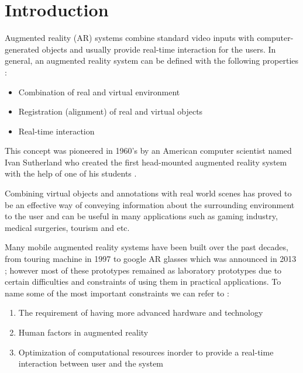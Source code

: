 \documentclass[dvips,letterpaper,12pt]{report}
\begin{document}
\chapter{Introduction}

Augmented reality (AR) systems combine standard video inputs with computer-generated objects and
usually provide real-time interaction for the users. 
In general, an augmented reality system can be defined with the following properties \cite{azuma01} :
\begin{itemize}
\item Combination of real and virtual environment
\item Registration (alignment) of real and virtual objects
\item Real-time interaction
\end{itemize}
This concept was pioneered in 1960’s by an American computer scientist named Ivan Sutherland
who created the first head-mounted augmented reality
system with the help of one of his students \cite{azuma01}.

Combining virtual objects and annotations with real
world scenes has proved to be an effective way of conveying information about the surrounding environment to
the user and can be useful in many applications such as gaming industry, medical surgeries, tourism and etc.

Many mobile augmented reality systems have been built over the past decades, from touring machine in 1997 \cite{fei97} 
to google AR glasses which was announced in 2013 \cite{google}; however most of these prototypes remained as laboratory prototypes
due to certain difficulties and constraints of using them in practical applications. To name some of the most important constraints
we can refer to \cite{liv05}:
\begin{enumerate}
\item The requirement of having more advanced hardware and technology
\item Human factors in augmented reality 
\item Optimization of computational resources inorder to provide a real-time interaction between user and the system
\end{enumerate}
\end{document}
